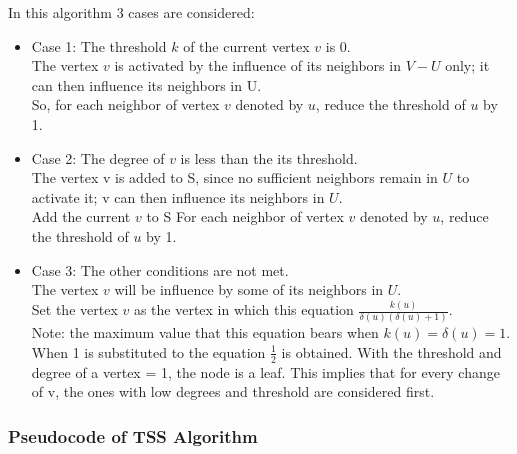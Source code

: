 	In this algorithm 3 cases are considered:
	\begin{itemize}
		\item Case 1: The threshold $k$ of the current vertex $v$ is 0.\\
		The vertex $v$ is activated by the influence of its neighbors in $V - U$ only; it can then influence its neighbors in U.\\
		So, for each neighbor of vertex $v$ denoted by $u$, reduce the threshold of $u$ by 1.
		\item Case 2: The degree of $v$ is less than the its threshold.\\
		The vertex v is added to S, since no sufficient neighbors remain in $U$ to activate it; v can then influence its neighbors in $U$.\\
		Add the current $v$ to S
		For each neighbor of vertex $v$ denoted by $u$, reduce the threshold of $u$ by 1.
		\item Case 3: The other conditions are not met.\\
		The vertex $v$ will be influence by some of its neighbors in $U$.\\
		Set the vertex $v$ as the vertex in which this equation $\frac{k(u)}{\delta(u)(\delta(u)+1)}$.\\ Note: the maximum value that this equation bears when $k(u)=\delta(u)=1$. When 1 is substituted to the equation $\frac{1}{2}$ is obtained. With the threshold and degree of a vertex = 1, the node is a leaf. This implies that for every change of v, the ones with low degrees and threshold are considered first.
		
	\end{itemize}
	
	\subsubsection{Pseudocode of TSS Algorithm}
